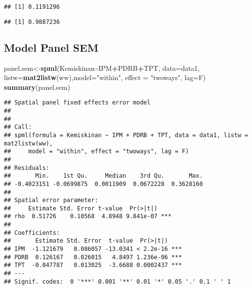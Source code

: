 \documentclass[
]{book}
\newenvironment{Shaded}{\begin{snugshade}}{\end{snugshade}}
\newcommand{\CommentTok}[1]{\textcolor[rgb]{0.56,0.35,0.01}{\textit{#1}}}
\newcommand{\DataTypeTok}[1]{\textcolor[rgb]{0.13,0.29,0.53}{#1}}
\newcommand{\KeywordTok}[1]{\textcolor[rgb]{0.13,0.29,0.53}{\textbf{#1}}}
\newcommand{\NormalTok}[1]{#1}
\newcommand{\OperatorTok}[1]{\textcolor[rgb]{0.81,0.36,0.00}{\textbf{#1}}}
\newcommand{\StringTok}[1]{\textcolor[rgb]{0.31,0.60,0.02}{#1}}
\begin{document}
\begin{verbatim}
## [1] 0.1191296
\end{verbatim}

\begin{Shaded}
\end{Shaded}

\begin{verbatim}
## [1] 0.9887236
\end{verbatim}

\hypertarget{model-panel-sem}{%
\subsection{Model Panel SEM}\label{model-panel-sem}}

\begin{Shaded}
\begin{Highlighting}[]
\NormalTok{panel.sem\textless{}{-}}\KeywordTok{spml}\NormalTok{(Kemiskinan}\OperatorTok{\textasciitilde{}}\NormalTok{IPM}\OperatorTok{+}\NormalTok{PDRB}\OperatorTok{+}\NormalTok{TPT, }\DataTypeTok{data=}\NormalTok{data1, }\DataTypeTok{listw=}\KeywordTok{mat2listw}\NormalTok{(ww),}\DataTypeTok{model=}\StringTok{"within"}\NormalTok{, }
                \DataTypeTok{effect =} \StringTok{"twoways"}\NormalTok{, }\DataTypeTok{lag=}\NormalTok{F)}
\KeywordTok{summary}\NormalTok{(panel.sem)}
\end{Highlighting}
\end{Shaded}

\begin{verbatim}
## Spatial panel fixed effects error model
##  
## 
## Call:
## spml(formula = Kemiskinan ~ IPM + PDRB + TPT, data = data1, listw = mat2listw(ww), 
##     model = "within", effect = "twoways", lag = F)
## 
## Residuals:
##       Min.    1st Qu.     Median    3rd Qu.       Max. 
## -0.4023151 -0.0699875  0.0011909  0.0672228  0.3628160 
## 
## Spatial error parameter:
##     Estimate Std. Error t-value  Pr(>|t|)    
## rho  0.51726    0.10568  4.8948 9.841e-07 ***
## 
## Coefficients:
##       Estimate Std. Error  t-value  Pr(>|t|)    
## IPM  -1.121679   0.086057 -13.0341 < 2.2e-16 ***
## PDRB  0.126167   0.026015   4.8497 1.236e-06 ***
## TPT  -0.047787   0.013025  -3.6688 0.0002437 ***
## ---
## Signif. codes:  0 '***' 0.001 '**' 0.01 '*' 0.05 '.' 0.1 ' ' 1
\end{verbatim}
\end{document}
